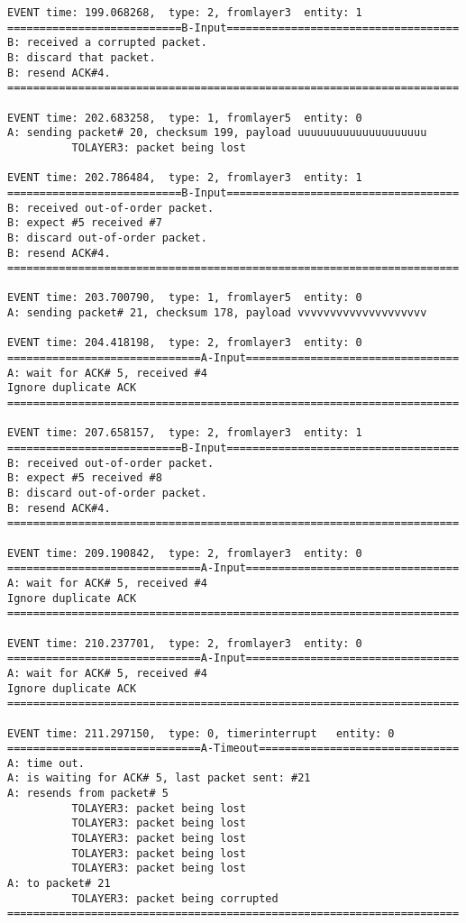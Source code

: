 \documentclass[12pt]{article}
\begin{document}
\begin{verbatim}
EVENT time: 199.068268,  type: 2, fromlayer3  entity: 1
===========================B-Input====================================
B: received a corrupted packet.
B: discard that packet.
B: resend ACK#4.
======================================================================

EVENT time: 202.683258,  type: 1, fromlayer5  entity: 0
A: sending packet# 20, checksum 199, payload uuuuuuuuuuuuuuuuuuuu
          TOLAYER3: packet being lost

EVENT time: 202.786484,  type: 2, fromlayer3  entity: 1
===========================B-Input====================================
B: received out-of-order packet.
B: expect #5 received #7
B: discard out-of-order packet.
B: resend ACK#4.
======================================================================

EVENT time: 203.700790,  type: 1, fromlayer5  entity: 0
A: sending packet# 21, checksum 178, payload vvvvvvvvvvvvvvvvvvvv

EVENT time: 204.418198,  type: 2, fromlayer3  entity: 0
==============================A-Input=================================
A: wait for ACK# 5, received #4
Ignore duplicate ACK
======================================================================

EVENT time: 207.658157,  type: 2, fromlayer3  entity: 1
===========================B-Input====================================
B: received out-of-order packet.
B: expect #5 received #8
B: discard out-of-order packet.
B: resend ACK#4.
======================================================================

EVENT time: 209.190842,  type: 2, fromlayer3  entity: 0
==============================A-Input=================================
A: wait for ACK# 5, received #4
Ignore duplicate ACK
======================================================================

EVENT time: 210.237701,  type: 2, fromlayer3  entity: 0
==============================A-Input=================================
A: wait for ACK# 5, received #4
Ignore duplicate ACK
======================================================================

EVENT time: 211.297150,  type: 0, timerinterrupt   entity: 0
==============================A-Timeout===============================
A: time out. 
A: is waiting for ACK# 5, last packet sent: #21
A: resends from packet# 5 
          TOLAYER3: packet being lost
          TOLAYER3: packet being lost
          TOLAYER3: packet being lost
          TOLAYER3: packet being lost
          TOLAYER3: packet being lost
A: to packet# 21
          TOLAYER3: packet being corrupted
======================================================================


\end{verbatim}
\end{document}
